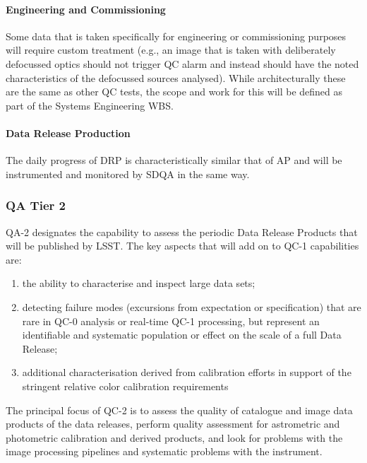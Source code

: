 \paragraph{Engineering and Commissioning}

Some data that is taken specifically for engineering or commissioning purposes will require custom treatment (e.g., an image that is taken with deliberately defocussed optics should not trigger QC alarm and instead should have the noted characteristics of the defocussed sources analysed). While architecturally these are the same as other QC tests, the scope and work for this will be defined as part of the Systems Engineering WBS.

\paragraph{Data Release Production}

The daily progress of DRP is characteristically similar that of AP and will be instrumented and monitored by SDQA in the same way.

\subsubsection{QA Tier 2}

QA-2 designates the capability to assess the periodic Data Release Products that will be published by LSST.  The key aspects that will add on to QC-1 capabilities are:

\begin{enumerate}

\item the ability to characterise and inspect large data sets;

\item detecting failure modes (excursions from expectation or specification) that are rare in QC-0 analysis or real-time QC-1 processing, but represent an identifiable and systematic population or effect on the scale of a full Data Release;

\item additional characterisation derived from calibration efforts in support of the stringent relative color calibration requirements

\end{enumerate}

The principal focus of QC-2 is to assess the quality of catalogue and image data products of the data releases, perform quality assessment for astrometric and photometric calibration and derived products, and look for problems with the image processing pipelines and systematic problems with the instrument.


